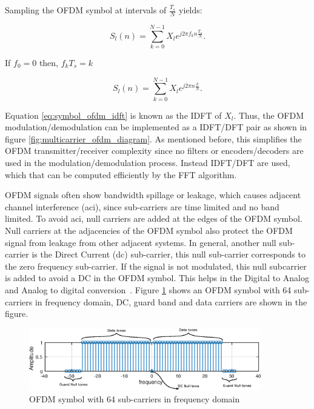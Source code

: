 Sampling the OFDM symbol at intervals of $\frac{T_s}{N}$ yields:


\begin{equation}
S_l(n) = \sum_{k = 0}^{N-1}X_le^{j2\pi f_k n\frac{T_s}{N}  } .
\label{eq:symbol_ofdm_discrete}
\end{equation}

If $f_0 = 0$ then, $f_kT_s = k$ 

\begin{equation}
S_l(n) = \sum_{k = 0}^{N-1}X_le^{j2\pi n\frac{k}{N}  } .
\label{eq:symbol_ofdm_idft}
\end{equation}

Equation \ref{eq:symbol_ofdm_idft} is known as the IDFT of $X_l$. Thus, the OFDM modulation/demodulation can be implemented as a IDFT/DFT pair as shown in figure \ref{fig:multicarrier_ofdm_diagram}. As mentioned before, this simplifies the OFDM transmitter/receiver complexity since no filters or encoders/decoders are used in the modulation/demodulation process. Instead IDFT/DFT are used, which that can be computed efficiently by the FFT algorithm. 

OFDM signals often show bandwidth spillage or leakage, which causes adjacent channel interference (\ac{aci}), since sub-carriers are time limited and no band limited. To avoid \ac{aci}, null carriers are added at the edges of the OFDM symbol. Null carriers at the adjacencies of the OFDM symbol also protect the OFDM signal from leakage from other adjacent systems. In general, another null sub-carrier is the Direct Current (\ac{dc}) sub-carrier, this null sub-carrier corresponds to the zero frequency sub-carrier. If the signal is not modulated, this null subcarrier is added to avoid a DC in the OFDM symbol. This helps in the Digital to Analog and Analog to digital conversion~\cite{nuaymi2007wimax}. Figure \ref{fig:ofdm_symbol_freq} shows an OFDM symbol with 64 sub-carriers in frequency domain, DC, guard band and data carriers are shown in the figure. 

\begin{figure}[hbt]
  \centering
    \includegraphics[width=0.9\textwidth]
      {./figures/ofdm_symbol_freq}
  \caption{OFDM symbol with 64 sub-carriers in frequency domain}
  \label{fig:ofdm_symbol_freq}
\end{figure}


